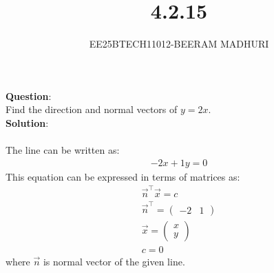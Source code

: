 \documentclass[journal]{IEEEtran}
\begin{document}

\vspace{3cm}

\title{4.2.15}
\author{EE25BTECH11012-BEERAM MADHURI}
{\let\newpage\relax\maketitle}

\renewcommand{\thefigure}{\theenumi}
\renewcommand{\thetable}{\theenumi}
\setlength{\intextsep}{10pt} %


\renewcommand{\thetable}{\theenumi}


\textbf{Question}:\\
Find the direction and normal vectors of $y=2x$. \\
\textbf{Solution}:\\\\
The line can be written as:
\begin{align}
-2x + 1y = 0
\end{align}
This equation can be expressed in terms of matrices as:
\begin{align}
\vec{n}^\top \vec{x} = c\\
\vec{n}^\top = \begin{pmatrix} -2 & 1 \end{pmatrix}\\
\vec{x} = \begin{pmatrix} x \\ y \end{pmatrix}\\
c = 0
\end{align}
where $\vec{n}$ is normal vector of the given line.
\end{document}
